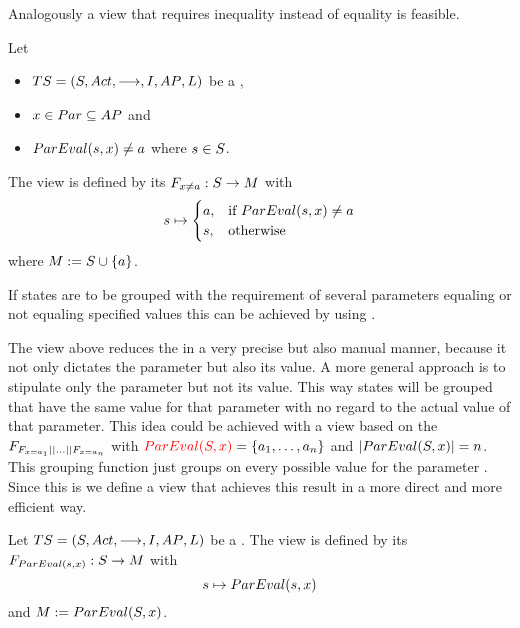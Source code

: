\documentclass[preview]{standalone}
\begin{document}
Analogously a view that requires inequality instead of equality is feasible.

\begin{definition}
	Let
	\begin{itemize}
		\item ${TS} = {({S}, {Act}, {\longrightarrow}, {I}, {AP}, {L})}$ be a \chosengraphtypeN,
		\item ${x} \in {Par} \subseteq {AP}$ and 
		\item ${ParEval}({s}, {x}) \neq {a}$ where ${s} \in {S}$.		
	\end{itemize} 
	The view \viewparamvaluesneq is defined by its \grpfctN ${{{F}}_{{x} \neq {a}}} : {S} \to {\ensuremath{{M}}}$ with
	\[
	{s} \mapsto
	\begin{cases}
		{a}, &\text{if } {ParEval}({s}, {x}) \neq {a}\\
		{s}, 	&\text{otherwise}
	\end{cases}
	\]
	where ${{M}} := {S} \cup \{a\}$.
\end{definition}

If states are to be grouped with the requirement of several parameters equaling or not equaling specified values this can be achieved by using \parllcompN. 

The view above reduces the \chosengraphtypeN in a very precise but also manual manner, because it not only dictates the parameter but also its value. A more general approach is to stipulate only the parameter but not its value. This way states will be grouped that have the same value for that parameter with no regard to the actual value of that parameter. This idea could be achieved with a view based on the \grpfctN $\grpfct_{\gfctparamvalueseqopt[\paramval_1] \pll \dots \pll \gfctparamvalueseqopt[\paramval_n]}$ with ${\color{red}{ParEval}({S}, {x})} = \{{a}_1, \dots, {a}_n\}$ and $|{ParEval}({S},{x})| = n$. This grouping function just groups on every possible value for the parameter \param. Since this is  we define a view that achieves this result in a more direct and more efficient way.

\begin{definition}
	Let ${TS} = {({S}, {Act}, {\longrightarrow}, {I}, {AP}, {L})}$ be a \chosengraphtypeN. The view \viewparamvalident is defined by its \grpfctN ${{{F}}_{{ParEval}({s},{x})}} : {S} \to {\ensuremath{{M}}}$ with
	\[
	{s} \mapsto {ParEval}({s},{x})
	\]
	and ${{M}} := {ParEval}({S}, {x})$.
\end{definition}
\end{document}
